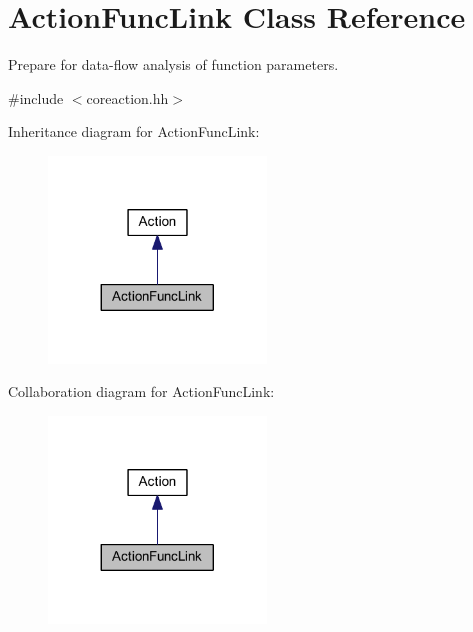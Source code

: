\hypertarget{class_action_func_link}{}\section{Action\+Func\+Link Class Reference}
\label{class_action_func_link}


Prepare for data-\/flow analysis of function parameters.  




{\ttfamily \#include $<$coreaction.\+hh$>$}



Inheritance diagram for Action\+Func\+Link\+:
\nopagebreak
\begin{figure}[H]
\begin{center}
\leavevmode
\includegraphics[width=164pt]{class_action_func_link__inherit__graph}
\end{center}
\end{figure}


Collaboration diagram for Action\+Func\+Link\+:
\nopagebreak
\begin{figure}[H]
\begin{center}
\leavevmode
\includegraphics[width=164pt]{class_action_func_link__coll__graph}
\end{center}
\end{figure}
